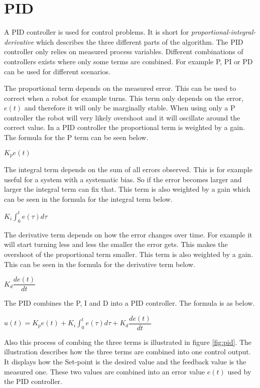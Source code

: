 \chapter{PID}
\label{chp:pid}
A PID controller is used for control problems. It is short for \emph{proportional-integral-derivative} which describes the three different parts of the algorithm. The PID controller only relies on measured process variables. Different combinations of controllers exists where only some terms are combined. For example P, PI or PD can be used for different scenarios. 

The proportional term depends on the measured error. This can be used to correct when a robot for example turns. This term only depends on the error, $e(t)$ and therefore it will only be marginally stable. When using only a P controller the robot will very likely overshoot and it will oscillate around the correct value. In a PID controller the proportional term is weighted by a gain. The formula for the P term can be seen below.
\begin{center}
	$K_p e(t)$
\end{center}

The integral term depends on the sum of all errors observed. This is for example useful for a system with a systematic bias. So if the error becomes larger and larger the integral term can fix that. This term is also weighted by a gain which can be seen in the formula for the integral term below.

\begin{center}
	$K_i \int_{0}^{t} e(\tau) d\tau$
\end{center}

The derivative term depends on how the error changes over time. For example it will start turning less and less the smaller the error gets. This makes the overshoot of the proportional term smaller. This term is also weighted by a gain. This can be seen in the formula for the derivative term below.

\begin{center}
	$K_d \dfrac{de(t)}{dt}$
\end{center}

The PID combines the P, I and D into a PID controller. The formula is as below.

\begin{center}
	$u(t) =  K_p e(t) + K_i \int_{0}^{t} e(\tau) d\tau + K_d \dfrac{de(t)}{dt}$
\end{center}

Also this process of combing the three terms is illustrated in figure \ref{fig:pid}. The illustration describes how the three terms are combined into one control output. It displays how the Set-point is the desired value and the feedback value is the measured one. These two values are combined into an error value $e(t)$ used by the PID controller.

